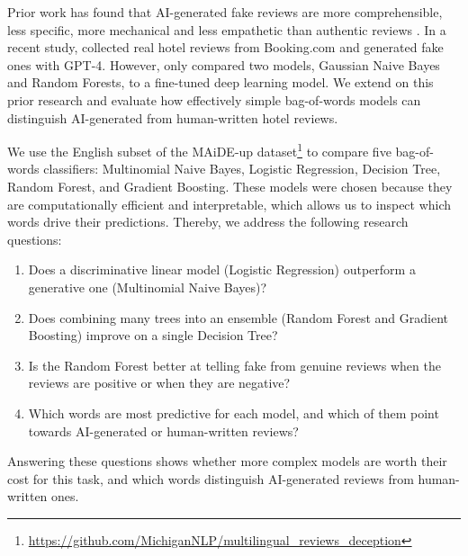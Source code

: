 \documentclass[pmlr]{jmlr}%
\begin{document}
Prior work has found that AI-generated fake reviews are more comprehensible, less specific, more mechanical and less empathetic than authentic reviews \citep{Zhao2025}. 
In a recent study, \citet{Ignat2025} collected real hotel reviews from Booking.com and generated fake ones with GPT-4.
However, \citeauthor{Ignat2025} only compared two models, Gaussian Naive Bayes and Random Forests, to a fine-tuned deep learning model.
We extend on this prior research and evaluate how effectively simple bag-of-words models can distinguish AI-generated from human-written hotel reviews.

We use the English subset of the MAiDE-up dataset\footnote{\url{https://github.com/MichiganNLP/multilingual_reviews_deception}} \citep{Ignat2025} to compare five bag-of-words classifiers: 
Multinomial Naive Bayes, Logistic Regression, Decision Tree, Random Forest, and Gradient Boosting. 
These models were chosen because they are computationally efficient and interpretable, which allows us to inspect which words drive their predictions.
Thereby, we address the following research questions:
\begin{enumerate}
  \item Does a discriminative linear model (Logistic Regression) outperform a generative one (Multinomial Naive Bayes)?
  \item Does combining many trees into an ensemble (Random Forest and Gradient Boosting) improve on a single Decision Tree?
  \item Is the Random Forest better at telling fake from genuine reviews when the reviews are positive or when they are negative?
  \item Which words are most predictive for each model, and which of them point towards AI-generated or human-written reviews?
\end{enumerate}
Answering these questions shows whether more complex models are worth their cost for this task, and which words distinguish AI-generated reviews from human-written ones.

\end{document}
